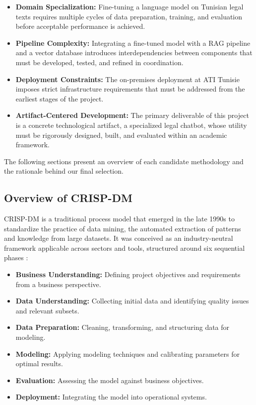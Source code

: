 \begin{itemize}
    \item \textbf{Domain Specialization:} Fine-tuning a language model on Tunisian 
    legal texts requires multiple cycles of data preparation, training, and evaluation 
    before acceptable performance is achieved.
    \item \textbf{Pipeline Complexity:} Integrating a fine-tuned model with a \ac{RAG} 
    pipeline and a vector database introduces interdependencies between components that 
    must be developed, tested, and refined in coordination.
    \item \textbf{Deployment Constraints:} The on-premises deployment at \ac{ATI} 
    Tunisie imposes strict infrastructure requirements that must be addressed from the 
    earliest stages of the project.
    \item \textbf{Artifact-Centered Development:} The primary deliverable of this 
    project is a concrete technological artifact, a specialized legal chatbot, whose 
    utility must be rigorously designed, built, and evaluated within an academic 
    framework.
\end{itemize}

The following sections present an overview of each candidate methodology and the 
rationale behind our final selection.

\subsection{Overview of CRISP-DM}

\ac{CRISP-DM} \cite{chapman2000crispdm} is a traditional process model that emerged 
in the late 1990s to standardize the practice of data mining, the automated 
extraction of patterns and knowledge from large datasets. It was conceived as an 
industry-neutral framework applicable across sectors and tools, structured around 
six sequential phases \cite{chapman2000crispdm}:

\begin{itemize}
    \item \textbf{Business Understanding:} Defining project objectives and requirements 
    from a business perspective.
    \item \textbf{Data Understanding:} Collecting initial data and identifying quality 
    issues and relevant subsets.
    \item \textbf{Data Preparation:} Cleaning, transforming, and structuring data for 
    modeling.
    \item \textbf{Modeling:} Applying modeling techniques and calibrating parameters 
    for optimal results.
    \item \textbf{Evaluation:} Assessing the model against business objectives.
    \item \textbf{Deployment:} Integrating the model into operational systems.
\end{itemize}

